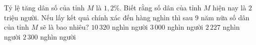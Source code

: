 \begin{ex}%
	Tỷ lệ tăng dân số của tỉnh $M$ là $1{,}2\%$. Biết rằng số dân của tỉnh $M$ hiện nay là $2$ triệu người. Nếu  lấy kết quả chính xác đến hàng nghìn thì sau $9$ năm nữa số dân của tỉnh $M$ sẽ là bao nhiêu?
	\choice 
		{$10\,320$  nghìn người}
		{$3\,000$  nghìn người}
		{\True $2\,227$ nghìn  người}
		{$2\,300$ nghìn người} 
\end{ex}

